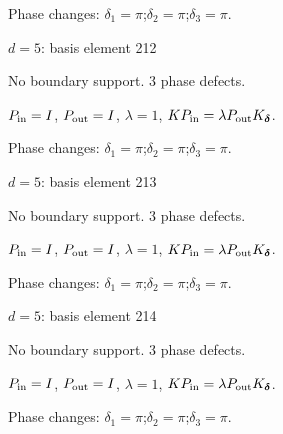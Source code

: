 \par\smallskip\begin{minipage}{.98\linewidth}\small Phase changes: $\delta_{1}=\pi$;\quad $\delta_{2}=\pi$;\quad $\delta_{3}=\pi$.\end{minipage}
\vfill
{\footnotesize\texttt{}}
\newpage
{}
{\Large $d=5$: basis element 212}\par
No boundary support. 3 phase defects.
\begin{center}
\end{center}
\vspace{-1mm}
$P_{\rm in}=I$, \quad $P_{\rm out}=I$, \quad $\lambda=1$, \qquad $K P_{\rm in}=\lambda P_{\rm out}K_{\boldsymbol\delta}$.
\par\smallskip\begin{minipage}{.98\linewidth}\small Phase changes: $\delta_{1}=\pi$;\quad $\delta_{2}=\pi$;\quad $\delta_{3}=\pi$.\end{minipage}
\vfill
{\footnotesize\texttt{}}
\newpage
{}
{\Large $d=5$: basis element 213}\par
No boundary support. 3 phase defects.
\begin{center}
\end{center}
\vspace{-1mm}
$P_{\rm in}=I$, \quad $P_{\rm out}=I$, \quad $\lambda=1$, \qquad $K P_{\rm in}=\lambda P_{\rm out}K_{\boldsymbol\delta}$.
\par\smallskip\begin{minipage}{.98\linewidth}\small Phase changes: $\delta_{1}=\pi$;\quad $\delta_{2}=\pi$;\quad $\delta_{3}=\pi$.\end{minipage}
\vfill
{\footnotesize\texttt{}}
\newpage
{}
{\Large $d=5$: basis element 214}\par
No boundary support. 3 phase defects.
\begin{center}
\end{center}
\vspace{-1mm}
$P_{\rm in}=I$, \quad $P_{\rm out}=I$, \quad $\lambda=1$, \qquad $K P_{\rm in}=\lambda P_{\rm out}K_{\boldsymbol\delta}$.
\par\smallskip\begin{minipage}{.98\linewidth}\small Phase changes: $\delta_{1}=\pi$;\quad $\delta_{2}=\pi$;\quad $\delta_{3}=\pi$.\end{minipage}
